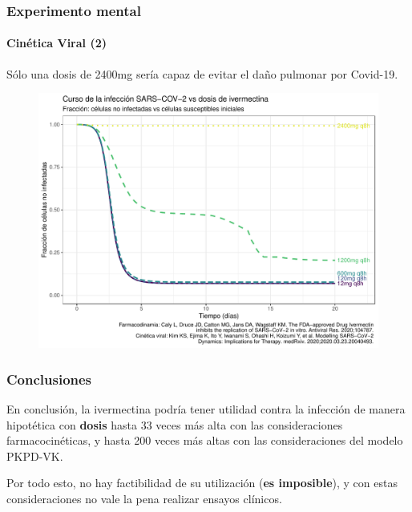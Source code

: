 \documentclass[12pt,xcolor=dvipsnames]{beamer}
\begin{document}
	\begin{frame}	
		\frametitle{Experimento mental}\framesubtitle{Cinética Viral (2)}
		\scriptsize Sólo una dosis de 2400mg sería capaz de evitar el daño pulmonar por Covid-19.
		\begin{figure}
			\centering
			\includegraphics[width=0.80\linewidth]{../modelo_PD_2/figuras/G4}
			\label{fig:g1}
		\end{figure}
	\end{frame}

	\begin{frame}
		\frametitle{Conclusiones}
		\begin{block}{}
		En conclusión, la ivermectina podría tener utilidad contra la infección de manera hipotética con \textbf{dosis} hasta 33 veces más alta con las consideraciones farmacocinéticas, y hasta 200 veces más altas con las consideraciones del modelo PKPD-VK. 	
		\end{block}
		\vspace{2em}
		Por todo esto, no hay factibilidad de su utilización (\textbf{es imposible}), y con estas consideraciones no vale la pena realizar ensayos clínicos.\\
	\end{frame}
\end{document}
